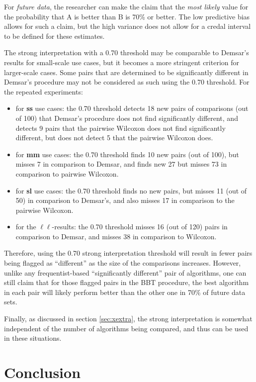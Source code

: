 \documentclass[twoside,11pt,preprint]{article}
\begin{document}
For \emph{future data}, the researcher can make the claim that the \emph{most likely} value for the probability that A is better than B is 70\% or better. The low predictive bias allows for such a claim, but the high variance does not allow for a credal interval to be defined for these estimates.

The strong interpretation with a 0.70 threshold may be comparable to Demsar's results for small-scale use cases, but it becomes a more stringent criterion for larger-scale cases. Some pairs that are determined to be significantly different in Demsar's procedure may not be considered as such using the 0.70 threshold. For the repeated experiments:

\begin{itemize}
\item
  for \textbf{ss} use cases: the 0.70 threshold detects 18 new pairs of
  comparisons (out of 100) that Demsar's procedure does not find
  significantly different, and detects 9 pairs that the pairwise
  Wilcoxon does not find significantly different, but does not detect
  5 that the pairwise Wilcoxon does.
\item
  for \textbf{mm} use cases: the 0.70 threshold finds 10 new pairs (out of
  100), but misses 7 in comparison to Demsar, and finds new 27 but
  misses 73 in comparison to pairwise Wilcoxon.
\item
  for \textbf{sl} use cases: the 0.70 threshold finds no new pairs, but
  misses 11 (out of 50) in comparison to Demsar's, and also misses 17
  in comparison to the pairwise Wilcoxon.
\item
  for the $\ell\ell$-results: the 0.70 threshold misses 16 (out of 120)
  pairs in comparison to Demsar, and misses 38 in comparison to
  Wilcoxon.
\end{itemize}

Therefore, using the 0.70 strong interpretation threshold will result in fewer pairs being flagged as ``different'' as the size of the comparisons increases. However, unlike any frequentist-based ``significantly different'' pair of algorithms, one can still claim that for those flagged pairs in the BBT procedure, the best algorithm in each pair will likely perform better than the other one in 70\% of future data sets.

Finally, as discussed in section \ref{sec:xextra}, the strong interpretation is somewhat independent of the number of algorithms being compared, and thus can be used in these situations.

\hypertarget{conclusion}{%
\section{\texorpdfstring{Conclusion \label{sec:conc}}{Conclusion }}\label{conclusion}}
\end{document}
